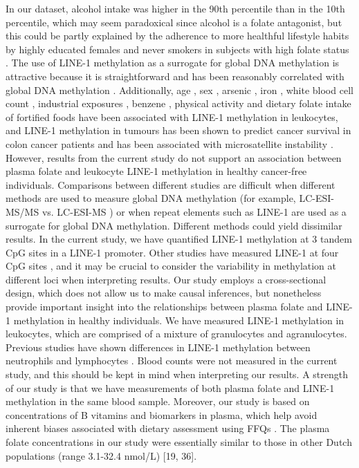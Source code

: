 In our dataset, alcohol intake was higher in the 90th percentile than in the 10th percentile, which may seem paradoxical since alcohol is a folate antagonist, but this could be partly explained by the adherence to more healthful lifestyle habits by highly educated females and never smokers in subjects with high folate status \cite{c333}. 
The use of LINE-1 methylation as a surrogate for global DNA methylation is attractive because it is straightforward and has been reasonably correlated with global DNA methylation \cite{c328}. Additionally, age \cite{c37,c39}, sex \cite{c310,c313}, arsenic \cite{c311}, iron \cite{c311}, white blood cell count \cite{c310}, industrial exposures \cite{c314}, benzene \cite{c315}, physical activity \cite{c316} and dietary folate intake of fortified foods \cite{c317} have been associated with LINE-1 methylation in leukocytes, and LINE-1 methylation in tumours has been shown to predict cancer survival in colon cancer patients \cite{c334} and has been associated with microsatellite instability \cite{c335}. However, results from the current study do not support an association between plasma folate and leukocyte LINE-1 methylation in healthy cancer-free individuals. 
Comparisons between different studies are difficult when different methods are used to measure global DNA methylation (for example, LC-ESI-MS/MS \cite{c319} vs. LC-ESI-MS \cite{c318}) or when repeat elements such as LINE-1 are used as a surrogate for global DNA methylation. Different methods could yield dissimilar results. In the current study, we have quantified LINE-1 methylation at 3 tandem CpG sites in a LINE-1 promoter. Other studies have measured LINE-1 at four CpG sites \cite{c311}, and it may be crucial to consider the variability in methylation at different loci \cite{c331} when interpreting results. 
Our study employs a cross-sectional design, which does not allow us to make causal inferences, but nonetheless provide important insight into the relationships between plasma folate and LINE-1 methylation in healthy individuals. We have measured LINE-1 methylation in leukocytes, which are comprised of a mixture of granulocytes and agranulocytes. Previous studies have shown differences in LINE-1 methylation between neutrophils and lymphocytes \cite{c310}. Blood counts were not measured in the current study, and this should be kept in mind when interpreting our results. A strength of our study is that we have measurements of both plasma folate and LINE-1 methylation in the same blood sample. Moreover, our study is based on concentrations of B vitamins and biomarkers in plasma, which help avoid inherent biases associated with dietary assessment using FFQs \cite{c320}. The plasma folate concentrations in our study were essentially similar to those in other Dutch populations (range 3.1-32.4 nmol/L) [19, 36]. 
